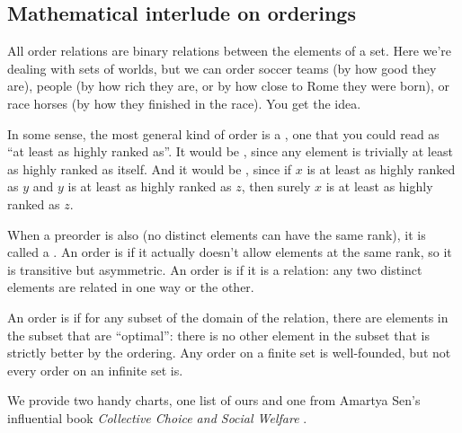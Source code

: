 \subsection{Mathematical interlude on orderings}
\label{subsec:math-orderings}

All order relations are binary relations between the elements of a set. Here
we're dealing with sets of worlds, but we can order soccer teams (by how good
they are), people (by how rich they are, or by how close to Rome they were
born), or race horses (by how they finished in the race). You get the idea.

In some sense, the most general kind of order is a , one that you
could read as ``at least as highly ranked as''. It would be ,
since any element is trivially at least as highly ranked as itself. And it would
be , since if $x$ is at least as highly ranked as $y$ and $y$
is at least as highly ranked as $z$, then surely $x$ is at least as highly
ranked as $z$.

When a preorder is also  (no distinct elements can have the
same rank), it is called a . An order is  if it
actually doesn't allow elements at the same rank, so it is transitive but
asymmetric. An order is  if it is a  relation: any
two distinct elements are related in one way or the other.

An order is  if for any subset of the domain of the relation,
there are elements in the subset that are ``optimal'': there is no other element
in the subset that is strictly better by the ordering. Any order on a finite set
is well-founded, but not every order on an infinite set is.

We provide two handy charts, one list of ours and one from Amartya Sen's
influential book \emph{Collective Choice and Social Welfare}
\parencite{sen-1970-collective-choice}.

